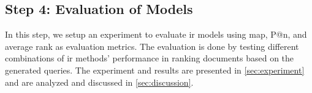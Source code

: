 \subsection*{Step 4: Evaluation of Models}
In this step, we setup an experiment to evaluate \gls{ir} models using \gls{map}, P@n, and average rank as evaluation metrics.
The evaluation is done by testing different combinations of \gls{ir} methods' performance in ranking documents based on the generated queries. 
The experiment and results are presented in \autoref{sec:experiment} and are analyzed and discussed in \autoref{sec:discussion}.



